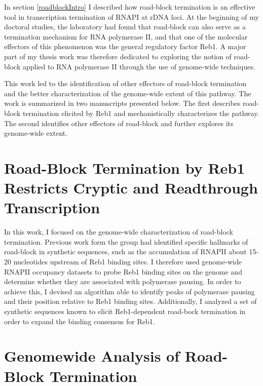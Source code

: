 
In section \ref{roadblockIntro} I described how road-block termination is an effective tool in transcription termination of RNAPI at rDNA loci. 
At the beginning of my doctoral studies, the laboratory had found that road-block can also serve as a termination mechanism for RNA polymerase II, and that one of the molecular effectors of this phenomenon was the general regulatory factor Reb1. 
A major part of my thesis work was therefore dedicated to exploring the notion of road-block applied to RNA polymerase II through the use of genome-wide techniques.

This work led to the identification of other effectors of road-block termination and the better characterization of the genome-wide extent of this pathway. 
The work is summarized in two manuscripts presented below. 
The first describes road-block termination elicited by Reb1 and mechanistically characterizes the pathway.
The second identifies other effectors of road-block and further explores its genome-wide extent.

\singlespacing
\section{Road-Block Termination by Reb1 Restricts Cryptic and Readthrough Transcription}
\doublespacing

In this work, I focused on the genome-wide characterization of road-block termination. 
Previous work form the group had identified specific hallmarks of road-block in synthetic sequences, such as the accumulation of RNAPII about 15-20 nucleotides upstream of Reb1 binding sites. 
I therefore used genome-wide RNAPII occupancy datasets to probe Reb1 binding sites on the genome and determine whether they are associated with polymerase pausing. 
In order to achieve this, I devised an algorithm able to identify peaks of polymerase pausing and their position relative to Reb1 binding sites. 
Additionally, I analyzed a set of synthetic sequences known to elicit Reb1-dependent road-bock termination in order to expand the binding consensus for Reb1. 

\clearpage




\clearpage

\singlespacing
\section{Genomewide Analysis of Road-Block Termination}
\doublespacing

